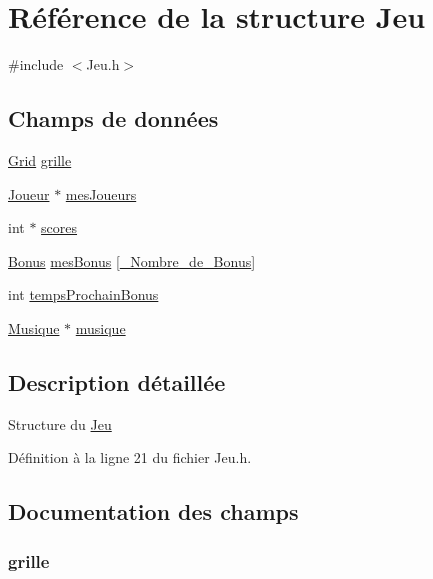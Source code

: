 \hypertarget{struct_jeu}{\section{Référence de la structure Jeu}
\label{struct_jeu}
}


{\ttfamily \#include $<$Jeu.\-h$>$}

\subsection*{Champs de données}
\begin{DoxyCompactItemize}
\item 
\hyperlink{struct_grid}{Grid} \hyperlink{struct_jeu_a781153be5e9eae59fb7a8f62eb840b6d}{grille}
\item 
\hyperlink{struct_joueur}{Joueur} $\ast$ \hyperlink{struct_jeu_a632589b4fe33211e88d71bab5b8fecb1}{mes\-Joueurs}
\item 
int $\ast$ \hyperlink{struct_jeu_a859dd84beee150c7f6f6e683f1dc91ac}{scores}
\item 
\hyperlink{struct_bonus}{Bonus} \hyperlink{struct_jeu_a9ba9a1f879502d127ed00db670605ac7}{mes\-Bonus} \mbox{[}\hyperlink{_constantes_8h_af4e31715ab308023d6200e64b86b9946}{\-\_\-\-Nombre\-\_\-de\-\_\-\-Bonus}\mbox{]}
\item 
int \hyperlink{struct_jeu_a9691871ea592a3579dcc143a4730aa08}{temps\-Prochain\-Bonus}
\item 
\hyperlink{struct_musique}{Musique} $\ast$ \hyperlink{struct_jeu_a59b3353d7adab6e96e762c4f8aee2d87}{musique}
\end{DoxyCompactItemize}


\subsection{Description détaillée}
Structure du \hyperlink{struct_jeu}{Jeu} 

Définition à la ligne 21 du fichier Jeu.\-h.



\subsection{Documentation des champs}
\hypertarget{struct_jeu_a781153be5e9eae59fb7a8f62eb840b6d}{
\subsubsection[{grille}]{ grille}}\label{struct_jeu_a781153be5e9eae59fb7a8f62eb840b6d}


